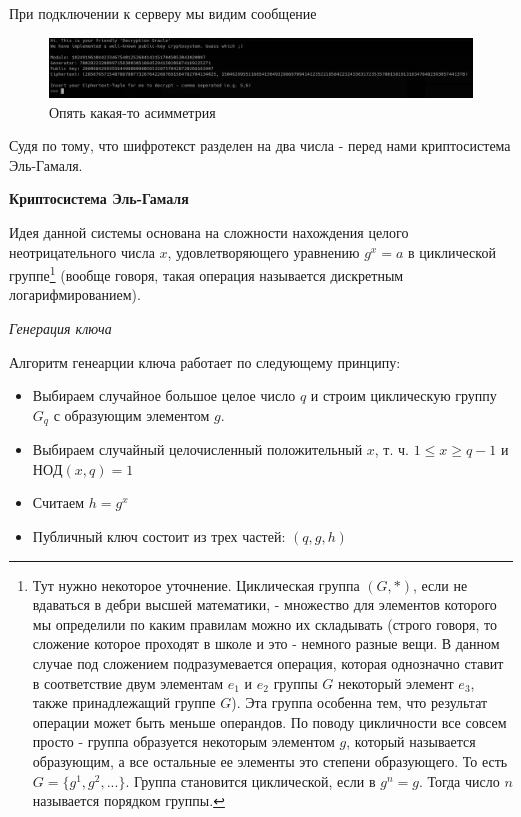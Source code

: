 \documentclass[idxtotoc,hyperref,openany,oneside]{files/crypto} %
\begin{document}
При подключении к серверу мы видим сообщение
\begin{figure}[H]
\begin{center}
\includegraphics[width=1.0\linewidth]{files/elgamal}
\end{center}
\caption{Опять какая-то асимметрия}
\label{fig:chinese}
\end{figure}
Судя по тому, что шифротекст разделен на два числа - перед нами криптосистема Эль-Гамаля.

\textbf{Криптосистема Эль-Гамаля}

Идея данной системы основана на сложности нахождения целого неотрицательного числа $x$, удовлетворяющего уравнению $g^x = a$ в циклической группе\footnote{Тут нужно некоторое уточнение. Циклическая группа $(G, *)$, если не вдаваться в дебри высшей математики, - множество для элементов которого мы определили по каким правилам можно их складывать (строго говоря, то сложение которое проходят в школе и это - немного разные вещи. В данном случае под сложением подразумевается операция, которая однозначно ставит в соответствие двум элементам $e_1$ и $e_2$ группы $G$ некоторый элемент $e_3$, также принадлежащий группе $G$). Эта группа особенна тем, что результат операции может быть меньше операндов. По поводу цикличности все совсем просто - группа образуется некоторым элементом $g$, который называется образующим, а все остальные ее элементы это степени образующего. То есть $G = \{g^1, g^2, ...\}$. Группа становится циклической, если в $g^n = g$. Тогда число $n$ называется порядком группы.} (вообще говоря, такая операция называется дискретным логарифмированием). 

\textit{Генерация ключа}

Алгоритм генеарции ключа работает по следующему принципу:
\begin{itemize}
	\item Выбираем случайное большое целое число $q$ и строим циклическую группу $G_q$ с образующим элементом $g$.
	\item Выбираем случайный целочисленный положительный $x$, т. ч. $1 \leq x \geq q - 1$ и $НОД(x, q) = 1$
	\item Считаем $h = g^x$
	\item Публичный ключ состоит из трех частей: $(q, g, h)$
\end{itemize}
\end{document}
